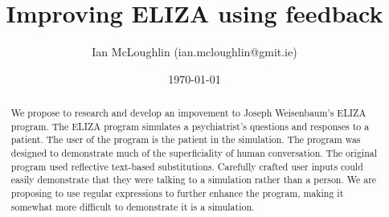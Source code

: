 
\title{Improving ELIZA using feedback}
\author{Ian McLoughlin (ian.mcloughlin@gmit.ie)}
\date{\today}





  \maketitle

  \begin{abstract}
    We propose to research and develop an impovement to Joseph Weisenbaum's
    ELIZA program. The ELIZA program simulates a psychiatrist's questions and
    responses to a patient. The user of the program is the patient in the
    simulation. The program was designed to demonstrate much of the
    superficiality of human conversation. The original program used
    reflective text-based substitutions. Carefully crafted user inputs could
    easily demonstrate that they were talking to a simulation rather than a
    person. We are proposing to use regular expressions to further enhance the
    program, making it somewhat more difficult to demonstrate it is a
    simulation.
  \end{abstract}

